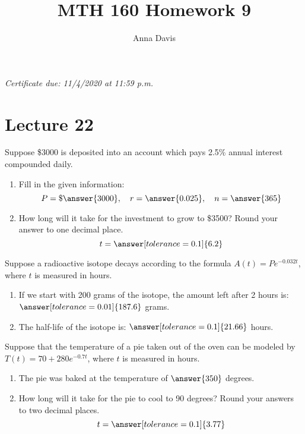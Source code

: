 \documentclass{ximera}
\author{Anna Davis} \title{MTH 160 Homework 9}
\begin{document}
\begin{abstract}

\end{abstract}
\maketitle
 \textit{Certificate due: 11/4/2020 at 11:59 p.m.}
 \section{Lecture 22}
 
  \begin{problem}\label{prob:160hom9prob1} 
Suppose \$3000 is deposited into an account which pays 2.5\% annual interest compounded daily.  
 \begin{enumerate}
 \item Fill in the given information:
 $$P=\$\answer{3000},\quad r=\answer{0.025},\quad n=\answer{365}$$
 \item How long will it take for the investment to grow to \$3500?
 Round your answer to one decimal place.
 $$t=\answer[tolerance=0.1]{6.2}$$
 \end{enumerate}
 \end{problem}
 
 \begin{problem}\label{prob:160hom9prob2} 
 Suppose a radioactive isotope decays according to the formula $A(t)=Pe^{-0.032t}$, where $t$ is measured in hours.  
 \begin{enumerate}
     \item 
If we start with 200 grams of the isotope, the amount left after 2 hours is: $\answer[tolerance=0.01]{187.6}$ grams.
\item The half-life of the isotope is: $\answer[tolerance=0.1]{21.66}$ hours.
\end{enumerate}
 \end{problem}

\begin{problem}\label{prob:160hom9prob3}
 Suppose that the temperature of a pie taken out of the oven can be modeled by $T(t)=70+280e^{-0.7t}$, where $t$ is measured in hours.
 \begin{enumerate}
     \item The pie was baked at the temperature of $\answer{350}$ degrees.
     \item How long will it take for the pie to cool to 90 degrees?  Round your answers to two decimal places.
     $$t=\answer[tolerance=0.1]{3.77}$$
 \end{enumerate}
 \end{problem}

 
\end{document}
